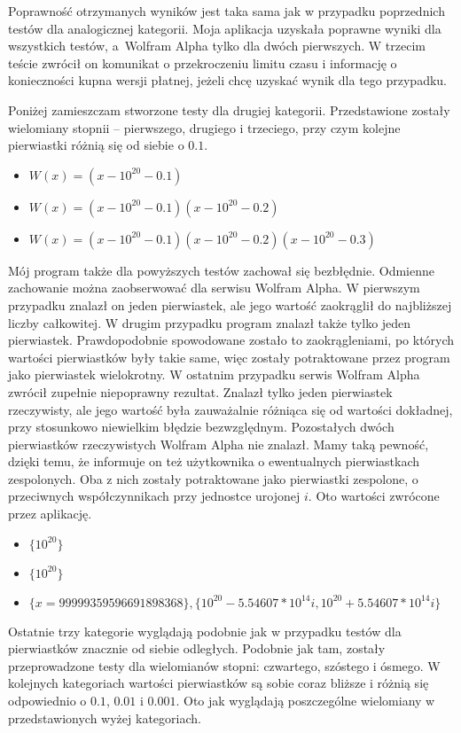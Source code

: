 Poprawność otrzymanych wyników jest taka sama jak w przypadku poprzednich testów dla analogicznej kategorii. Moja aplikacja uzyskała poprawne wyniki dla wszystkich testów, a~Wolfram Alpha tylko dla dwóch pierwszych. W trzecim teście zwrócił on komunikat o przekroczeniu limitu czasu i informację o konieczności kupna wersji płatnej, jeżeli chcę uzyskać wynik dla tego przypadku.

Poniżej zamieszczam stworzone testy dla drugiej kategorii. Przedstawione zostały wielomiany stopnii -- pierwszego, drugiego i trzeciego, przy czym kolejne pierwiastki różnią się od siebie o $0.1$.
\begin{itemize}
	\item $W(x)=(x-10^{20}-0.1)$
	\item $W(x)=(x-10^{20}-0.1)(x-10^{20}-0.2)$
	\item $W(x)=(x-10^{20}-0.1)(x-10^{20}-0.2)(x-10^{20}-0.3)$
\end{itemize}

Mój program także dla powyższych testów zachował się bezbłędnie. Odmienne zachowanie można zaobserwować dla serwisu Wolfram Alpha. W pierwszym przypadku znalazł on jeden pierwiastek, ale jego wartość zaokrąglił do najbliższej liczby całkowitej. W drugim przypadku program znalazł także tylko jeden pierwiastek. Prawdopodobnie spowodowane zostało to zaokrągleniami, po których wartości pierwiastków były takie same, więc zostały potraktowane przez program jako pierwiastek wielokrotny. W ostatnim przypadku serwis Wolfram Alpha zwrócił zupełnie niepoprawny rezultat. Znalazł tylko jeden pierwiastek rzeczywisty, ale jego wartość była zauważalnie różniąca się od wartości dokładnej, przy stosunkowo niewielkim błędzie bezwzględnym. Pozostałych dwóch pierwiastków rzeczywistych Wolfram Alpha nie znalazł. Mamy taką pewność, dzięki temu, że informuje on też użytkownika o ewentualnych pierwiastkach zespolonych. Oba z nich zostały potraktowane jako pierwiastki zespolone, o przeciwnych współczynnikach przy jednostce urojonej $i$. Oto wartości zwrócone przez aplikację.
\begin{itemize}
	\item $\{10^{20}\}$
	\item $\{10^{20}\}$
	\item $\{x = 99999359596691898368\}, \{10^{20}-5.54607*10^{14}i, 10^{20}+5.54607*10^{14}i\}$
\end{itemize}

Ostatnie trzy kategorie wyglądają podobnie jak w przypadku testów dla pierwiastków znacznie od siebie odległych. Podobnie jak tam, zostały przeprowadzone testy dla wielomianów stopni: czwartego, szóstego i ósmego. W kolejnych kategoriach wartości pierwiastków są sobie coraz bliższe i różnią się odpowiednio o $0.1$, $0.01$ i $0.001$. Oto jak wyglądają poszczególne wielomiany w przedstawionych wyżej kategoriach.

